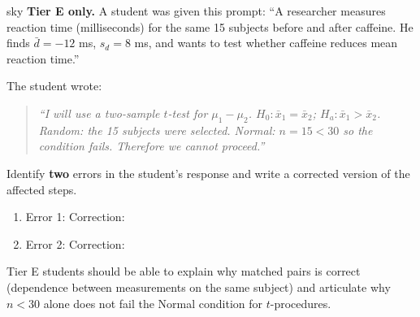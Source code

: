\documentclass[10pt]{article}
\begin{document}
\begin{scenariobox}{sky}
\textbf{Tier E only.} \; A student was given this prompt: ``A researcher measures reaction time
(milliseconds) for the same 15 subjects before and after caffeine. He finds
$\bar d = -12$ ms, $s_d = 8$ ms, and wants to test whether caffeine reduces mean reaction time.''

The student wrote:
\begin{quote}
\textit{``I will use a two-sample $t$-test for $\mu_1 - \mu_2$. $H_0: \bar x_1 = \bar x_2$;
$H_a: \bar x_1 > \bar x_2$. Random: the 15 subjects were selected. Normal: $n = 15 < 30$ so
the condition fails. Therefore we cannot proceed.''
}
\end{quote}

Identify \textbf{two} errors in the student's response and write a corrected version of the
affected steps.

\begin{enumerate}
  \item Error 1: 
        Correction: 
  \item Error 2: 
        Correction: 
\end{enumerate}

\begin{teachernote}
Tier E students should be able to explain why matched pairs is correct (dependence between
measurements on the same subject) and articulate why $n < 30$ alone does not fail the
Normal condition for $t$-procedures.
\end{teachernote}
\end{scenariobox}
\end{document}
